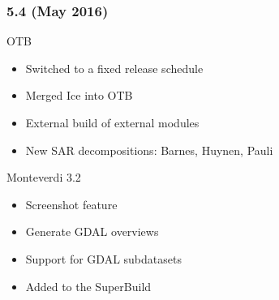 \documentclass[8pt]{beamer}
\begin{document}
\begin{frame}
\frametitle{5.4 (May 2016)}
\begin{block}{OTB}
\begin{itemize}
\item Switched to a fixed release schedule
\item Merged Ice into OTB
\item External build of external modules
\item New SAR decompositions: Barnes, Huynen, Pauli
\end{itemize}
\end{block}

\begin{block}{Monteverdi 3.2}
\begin{itemize}
\item Screenshot feature
\item Generate GDAL overviews
\item Support for GDAL subdatasets
\item Added to the SuperBuild
\end{itemize}
\end{block}
\end{frame}
\end{document}

